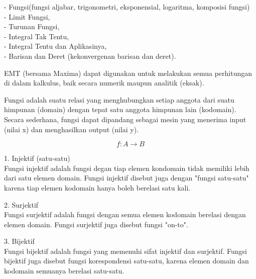 \documentclass[a4paper,10pt]{article}
\begin{document}
\begin{eulernotebook}
\begin{eulercomment}
\begin{eulercomment}
\begin{eulercomment}
\begin{eulercomment}
\begin{eulercomment}
\begin{eulercomment}
\begin{eulercomment}
\begin{eulercomment}
\begin{eulercomment}
\begin{eulercomment}
\begin{eulercomment}
\begin{eulercomment}
\begin{eulercomment}
\begin{eulercomment}
\begin{eulercomment}
- Fungsi(fungsi aljabar, trigonometri, eksponensial, logaritma,
komposisi fungsi)\\
- Limit Fungsi,\\
- Turunan Fungsi,\\
- Integral Tak Tentu,\\
- Integral Tentu dan Aplikasinya,\\
- Barisan dan Deret (kekonvergenan barisan dan deret).

EMT (bersama Maxima) dapat digunakan untuk melakukan semua perhitungan
di dalam kalkulus, baik secara numerik maupun analitik (eksak).

\begin{eulercomment}
\begin{eulercomment}
Fungsi adalah suatu relasi yang menghubungkan setiap anggota dari
suatu himpunan (domain) dengan tepat satu anggota himpunan lain
(kodomain). Secara sederhana, fungsi dapat dipandang sebagai mesin
yang menerima input (nilai x) dan menghasilkan output (nilai y).

\end{eulercomment}
\begin{eulerformula}
\[
f: A \to B
\]
\end{eulerformula}
\begin{eulercomment}
\end{eulercomment}
\begin{eulercomment}
1. Injektif (satu-satu)\\
Fungsi injektif adalah fungsi degan tiap elemen kondomain tidak
memiliki lebih dari satu elemen domain. Fungsi injektif disebut juga
dengan "fungsi satu-satu" karena tiap elemen kodomain hanya boleh
berelasi satu kali.

2. Surjektif\\
Fungsi surjektif adalah fungsi dengan semua elemen kodomain berelasi
dengan elemen domain. Fungsi surjektif juga disebut fungsi "on-to".

3. Bijektif\\
Fungsi bijektif adalah fungsi yang memenuhi sifat injektif dan
surjektif. Fungsi bijektif juga disebut fungsi korespondensi
satu-satu, karena elemen domain dan kodomain semuanya berelasi
satu-satu.


\end{eulercomment}
\end{eulercomment}
\end{eulercomment}
\end{eulercomment}
\end{eulercomment}
\end{eulercomment}
\end{eulercomment}
\end{eulercomment}
\end{eulercomment}
\end{eulercomment}
\end{eulercomment}
\end{eulercomment}
\end{eulercomment}
\end{eulercomment}
\end{eulercomment}
\end{eulercomment}
\end{eulercomment}
\end{eulernotebook}
\end{document}
